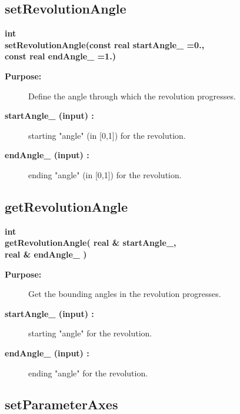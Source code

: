 \subsection{setRevolutionAngle}
 
\begin{flushleft} \textbf{%
int   \\ 
\settowidth{\RevolutionMappingIncludeArgIndent}{setRevolutionAngle(}%
setRevolutionAngle(const real startAngle\_  =0., \\ 
\hspace{\RevolutionMappingIncludeArgIndent}const real endAngle\_  =1.)
}\end{flushleft}
\begin{description}
\item[{\bf Purpose:}]  Define the angle through which the revolution progresses.
\item[{\bf startAngle\_ (input) :}]  starting "angle" (in [0,1]) for the revolution.
\item[{\bf endAngle\_ (input) :}]  ending "angle" (in [0,1]) for the revolution.
\end{description}
\subsection{getRevolutionAngle}
 
\begin{flushleft} \textbf{%
int   \\ 
\settowidth{\RevolutionMappingIncludeArgIndent}{getRevolutionAngle(}%
getRevolutionAngle( real \& startAngle\_, \\ 
\hspace{\RevolutionMappingIncludeArgIndent}real \& endAngle\_  )
}\end{flushleft}
\begin{description}
\item[{\bf Purpose:}]  Get the bounding angles in the revolution progresses.
\item[{\bf startAngle\_ (input) :}]  starting "angle" for the revolution.
\item[{\bf endAngle\_ (input) :}]  ending "angle" for the revolution.
\end{description}
\subsection{setParameterAxes}
 
